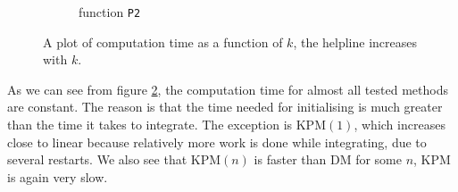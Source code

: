 \begin{figure}[H]
\begin{subfigure}[b]{0.45\textwidth}
                \caption{function \texttt{P2}}
                \label{fig:timek2}
        \end{subfigure}
        \caption{A plot of computation time as a function of $k$, the helpline increases with $k$.}\label{fig:timek}
\end{figure}
As we can see from figure \ref{fig:timek}, the computation time for almost all tested methods are constant. The reason is that the time needed for initialising is much greater than the time it takes to integrate. 
The exception is KPM$(1)$, which increases close to linear because relatively more work is done while integrating, due to several restarts.
We also see that KPM$(n)$ is faster than DM for some $n$, KPM is again very slow.
